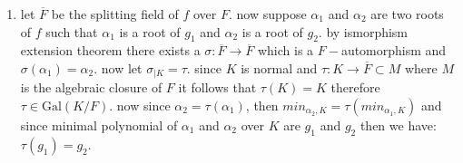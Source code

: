 \begin{enumerate}[label=]
    \item 
        let $\overline{F}$ be the splitting field of $f$ over $F$. now suppose $\alpha_1$ and $\alpha_2$ are two roots of $f$ such that
        $\alpha_1$ is a root of $g_1$ and $\alpha_2$ is a root of $g_2$. by ismorphism extension theorem there exists a
        $\sigma: \overline{F} \to \overline{F}$ which is a $F-$automorphism and $\sigma(\alpha_1) = \alpha_2$.
        now let $\sigma_{|K} = \tau$. since $K$ is normal and $\tau: K \to \overline{F} \subset M$ where $M$ is the algebraic closure of $F$ it follows that $\tau(K) = K$ therefore $\tau \in \text{Gal}(K/F)$.
        now since $\alpha_2 = \tau(\alpha_1)$, then $min_{\alpha_2, K} = \tau(min_{\alpha_1, K})$ and since minimal polynomial of $\alpha_1$ and $\alpha_2$ over $K$ are $g_1$ and $g_2$ then we have:
        $\tau(g_1) = g_2$.
\end{enumerate}